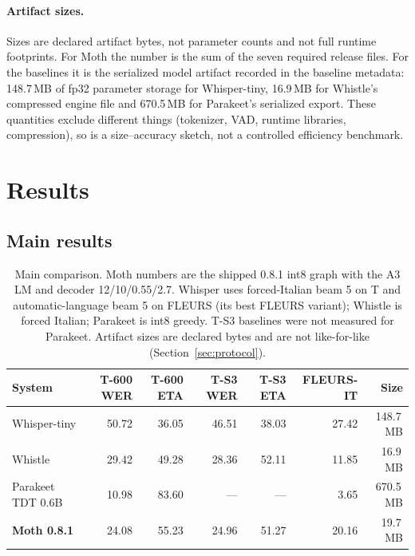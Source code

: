 \documentclass{article}
\newcommand{\moth}{Moth}
\begin{document}
\paragraph{Artifact sizes.}
Sizes are declared artifact bytes, not parameter counts and not full runtime footprints. For
\moth{} the number is the sum of the seven required release files. For the baselines it is the
serialized model artifact recorded in the baseline metadata: 148.7\,MB of fp32 parameter storage for Whisper-tiny,
16.9\,MB for Whistle's compressed engine file and 670.5\,MB for Parakeet's serialized export. These quantities exclude
different things (tokenizer, VAD, runtime libraries, compression), so  is a
size--accuracy sketch, not a controlled efficiency benchmark.

\section{Results}
\label{sec:results}

\subsection{Main results}

\begin{table}[t]
\centering
\small
\setlength{\tabcolsep}{4pt}
\caption{Main comparison. \moth{} numbers are the shipped 0.8.1 int8 graph with the A3 LM and
decoder 12/10/0.55/2.7. Whisper uses forced-Italian beam 5 on T and automatic-language beam 5 on
FLEURS (its best FLEURS variant); Whistle is forced Italian; Parakeet is int8 greedy. T-S3
baselines were not measured for Parakeet. Artifact sizes are declared bytes and are not
like-for-like (Section~\ref{sec:protocol}).}
\label{tab:main}
\begin{tabular}{@{}lrrrrrr@{}}
\toprule
System & T-600 WER & T-600 ETA & T-S3 WER & T-S3 ETA & FLEURS-IT & Size \\
\midrule
Whisper-tiny & 50.72 & 36.05 & 46.51 & 38.03 & 27.42 & 148.7\,MB \\
Whistle & 29.42 & 49.28 & 28.36 & 52.11 & 11.85 & 16.9\,MB \\
Parakeet TDT 0.6B & 10.98 & 83.60 & --- & --- & 3.65 & 670.5\,MB \\
\textbf{\moth{} 0.8.1} & 24.08 & 55.23 & 24.96 & 51.27 & 20.16 & 19.7\,MB \\
\bottomrule
\end{tabular}
\end{table}
\end{document}
